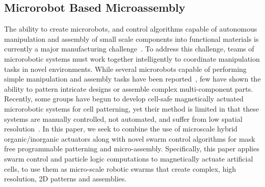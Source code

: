 \subsection{Microrobot Based Microassembly}
The ability to create microrobots, and control algorithms capable of autonomous manipulation and assembly of small scale components into functional materials is currently a major manufacturing challenge~\cite{chang2005therapeutic}. 
To address this challenge, teams of microrobotic systems must work together intelligently to coordinate manipulation tasks in novel environments. 
While several microrobots capable of performing simple manipulation and assembly tasks have been reported~\cite{prakash2007artificial,chang2007artificial,weibel2007microfabrication,abbott2007robotics,yi2006microfluidics,castillo2009manipulation}, few have shown the ability to pattern intricate designs or assemble complex multi-component parts. 
Recently, some groups have begun to develop cell-safe magnetically actuated microrobotic systems for cell patterning, yet their method is limited in that these systems are manually controlled, not automated, and suffer from low spatial resolution~\cite{tasoglu2014untethered,tasoglu2014guided}. 
In this paper, we seek to combine the use of microscale hybrid organic/inorganic actuators along with novel swarm control algorithms for mask free programmable patterning and micro-assembly. 
Specifically, this paper applies swarm control and particle logic computations to magnetically actuate artificial cells, to use them as micro-scale robotic swarms that create complex, high resolution, 2D patterns and assemblies.





 
